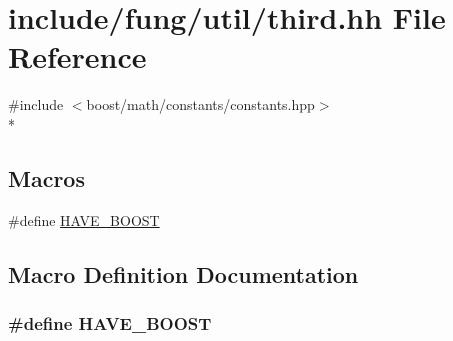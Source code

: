 \hypertarget{third_8hh}{}\section{include/fung/util/third.hh File Reference}
\label{third_8hh}
{\ttfamily \#include $<$boost/math/constants/constants.\+hpp$>$}\\*
\subsection*{Macros}
\begin{DoxyCompactItemize}
\item 
\#define \hyperlink{third_8hh_a1644f282a4f84575a270f96b98d4f3c6}{H\+A\+V\+E\+\_\+\+B\+O\+O\+ST}
\end{DoxyCompactItemize}


\subsection{Macro Definition Documentation}
\subsubsection[{\texorpdfstring{H\+A\+V\+E\+\_\+\+B\+O\+O\+ST}{HAVE_BOOST}}]{\setlength{\rightskip}{0pt plus 5cm}\#define H\+A\+V\+E\+\_\+\+B\+O\+O\+ST}\hypertarget{third_8hh_a1644f282a4f84575a270f96b98d4f3c6}{}\label{third_8hh_a1644f282a4f84575a270f96b98d4f3c6}
